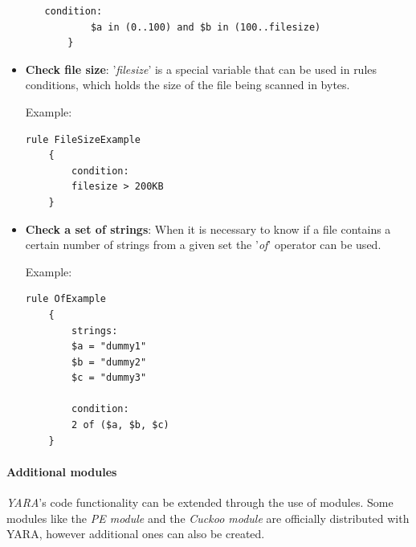 \documentclass[pdfa%
,cucitura%
]{toptesi}
\begin{document}
\begin{itemize}
\begin{itemize}
\begin{lstlisting}[caption={YARA In Example}, label=code:YaraIn, language=YARA, style=mystyle]
		condition:
		$a in (0..100) and $b in (100..filesize)
	}
		\end{lstlisting}
	\end{itemize}

	\item \textbf{Check file size}: '\textit{filesize}' is a special variable that can be used in rules conditions, which holds the size of the file being scanned in bytes.
	
	Example:
	\begin{lstlisting}[caption={YARA Filesize Example}, label=code:YaraFilesize, language=YARA, style=mystyle]
	rule FileSizeExample
	{
		condition:
		filesize > 200KB
	}
	\end{lstlisting}
	
	\item \textbf{Check a set of strings}: When it is necessary to know if a file contains a certain number of strings from a given set the '\textit{of}' operator can be used.
	
	Example:
	\begin{lstlisting}[caption={YARA Of Example}, label=code:YaraOf, language=YARA, style=mystyle]
	rule OfExample
	{
		strings:
		$a = "dummy1"
		$b = "dummy2"
		$c = "dummy3"
		
		condition:
		2 of ($a, $b, $c)
	}
	\end{lstlisting}
\end{itemize}

\paragraph{Additional modules}
\textit{YARA}'s code functionality can be extended through the use of modules. Some modules like the \textit{PE module} and the \textit{Cuckoo module} are officially distributed with YARA, however additional ones can also be created.
\end{document}
